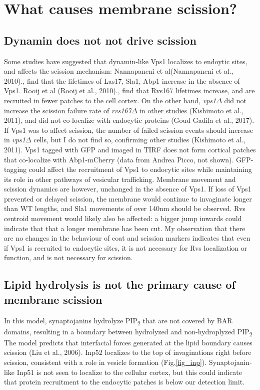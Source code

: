 \section{What causes membrane scission?}


\subsection{Dynamin does not not drive scission}
Some studies have suggested that dynamin-like Vps1 localizes to endoytic sites, and affects the scission mechanism: Nannapaneni et al(Nannapaneni et al., 2010)., find that the lifetimes of Las17, Sla1, Abp1 increase in the absence of Vps1. Rooij et al (Rooij et al., 2010)., find that Rvs167 lifetimes increase, and are recruited in fewer patches to the cell cortex. On the other hand, \textit{vps1$\Delta$} did not increase the scission failure rate of \textit{rvs167$\Delta$} in other studies (Kishimoto et al., 2011), and did not co-localize with endocytic proteins (Goud Gadila et al., 2017). If Vps1 was to affect scission, the number of failed scission events should increase in \textit{vps1$\Delta$} cells, but I do not find so, confirming other studies (Kishimoto et al., 2011). Vps1 tagged with GFP and imaged in TIRF does not form cortical patches that co-localize with Abp1-mCherry (data from Andrea Picco, not shown). GFP-tagging could affect the recruitment of Vps1 to endocytic sites while maintaining its role in other pathways of vesicular trafficking. Membrane movement and scission dynamics are however, unchanged in the absence of Vps1. If loss of Vps1 prevented or delayed scission, the membrane would continue to invaginate longer than WT lengths, and Sla1 movements of over 140nm should be observed. Rvs centroid movement would likely also be affected: a bigger jump inwards could indicate that that a longer membrane has been cut. My observation that there are no changes in the behaviour of coat and scission markers indicates that even if Vps1 is recruited to endocytic sites, it is not necessary for Rvs localization or function, and is not necessary for scission. 



\subsection{Lipid hydrolysis is not the primary cause of membrane scission}
In this model, synaptojanins hydrolyze 	PIP\textsubscript{2} that are not covered by BAR domains, resulting in a boundary between hydrolyzed and non-hydroplyzed 	PIP\textsubscript{2} The model predicts that interfacial forces generated at the lipid boundary causes scission (Liu et al., 2006).  Inp52 localizes to the top of invaginations right before scission, consistent with a role in vesicle formation (Fig.\ref{fig_inp}). Synaptojanin-like Inp51 is not seen to localize to the cellular cortex, but this could indicate that protein recruitment to the endocytic patches is below our detection limit. 


